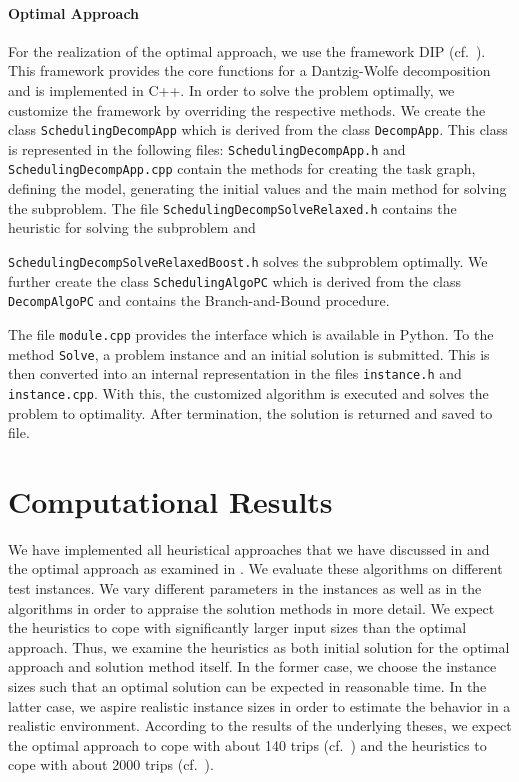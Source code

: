 \paragraph{Optimal Approach} \parfill

For the realization of the optimal approach, we use the framework DIP (cf.~\cite{DIP}). This framework provides the core functions for a Dantzig-Wolfe decomposition and is implemented in C++. In order to solve the problem optimally, we customize the framework by overriding the respective methods. We create the class \texttt{SchedulingDecompApp} which is derived from the class \texttt{DecompApp}. This class is represented in the following files: \texttt{SchedulingDecompApp.h} and \texttt{SchedulingDecompApp.cpp} contain the methods for creating the task graph, defining the model, generating the initial values and the main method for solving the subproblem. The file \texttt{SchedulingDecompSolveRelaxed.h} contains the heuristic for solving the subproblem and\par
\texttt{SchedulingDecompSolveRelaxedBoost.h} solves the subproblem optimally. We further create the class \texttt{SchedulingAlgoPC} which is derived from the class \texttt{DecompAlgoPC} and contains the Branch-and-Bound procedure.

The file \texttt{module.cpp} provides the interface which is available in Python. To the method \texttt{Solve}, a problem instance and an initial solution is submitted. This is then converted into an internal representation in the files \texttt{instance.h} and \texttt{instance.cpp}. With this, the customized algorithm is executed and solves the problem to optimality. After termination, the solution is returned and saved to file.


\section{Computational Results}
\label{sec:computational_results}

We have implemented all heuristical approaches that we have discussed in  and the optimal approach as examined in . We evaluate these algorithms on different test instances. We vary different parameters in the instances as well as in the algorithms in order to appraise the solution methods in more detail. We expect the heuristics to cope with significantly larger input sizes than the optimal approach. Thus, we examine the heuristics as both initial solution for the optimal approach and solution method itself. In the former case, we choose the instance sizes such that an optimal solution can be expected in reasonable time. In the latter case, we aspire realistic instance sizes in order to estimate the behavior in a realistic environment. According to the results of the underlying theses, we expect the optimal approach to cope with about 140 trips (cf.~\cite[p.~139]{Kaiser}) and the heuristics to cope with about 2000 trips (cf.~\cite[p.~138]{Knoll}).

